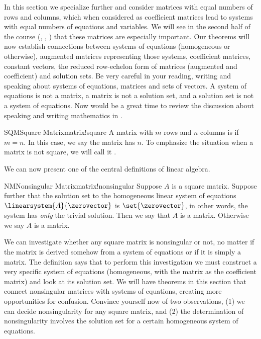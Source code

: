 %
In this section we specialize further and consider matrices with equal numbers of rows and columns, which when considered as coefficient matrices lead to systems with equal numbers of equations and variables.  We will see in the second half of the course (,  , ) that these matrices are especially important.
%
%
Our theorems will now establish connections between systems of equations (homogeneous or otherwise), augmented matrices representing those systems, coefficient matrices, constant vectors, the reduced row-echelon form of matrices (augmented and coefficient) and solution sets.  Be very careful in your reading, writing and speaking about systems of equations, matrices and sets of vectors.  A system of equations is not a matrix, a matrix is not a solution set, and a solution set is not a system of equations.  Now would be a great time to review the discussion about speaking and writing mathematics in .
%
\begin{definition}{SQM}{Square Matrix}{matrix!square}
A matrix with $m$ rows and $n$ columns is  if $m=n$.  In this case, we say the matrix has  $n$.  To emphasize the situation when a matrix is not square, we will call it .
\end{definition}
%
We can now present one of the central definitions of linear algebra.
%
\begin{definition}{NM}{Nonsingular Matrix}{matrix!nonsingular}
Suppose $A$ is a square matrix.  Suppose further that the solution set to the homogeneous linear system of equations $\linearsystem{A}{\zerovector}$ is $\set{\zerovector}$, in other words, the system has {\em only} the trivial solution.  Then we say that $A$ is a  matrix.  Otherwise we say $A$ is a  matrix.
\end{definition}
%
We can investigate whether any square matrix is nonsingular or not, no matter if the matrix is derived somehow from a system of equations or if it is simply a matrix.  The definition says that to perform this investigation we must construct a very specific system of equations (homogeneous, with the matrix as the coefficient matrix) and look at its solution set.  We will have theorems in this section that connect nonsingular matrices with systems of equations, creating more opportunities for confusion.  Convince yourself now of two observations, (1) we can decide nonsingularity for any square matrix, and (2) the determination of nonsingularity involves the solution set for a certain homogeneous system of equations.\par

